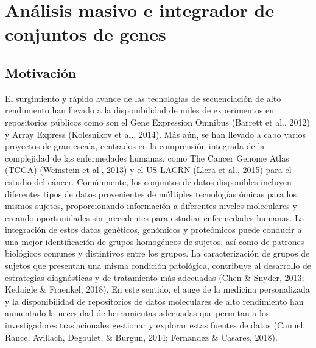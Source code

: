 \documentclass[12pt,twoside]{reedthesis}
\begin{document}
\hypertarget{cap:migsa}{%
\chapter{Análisis masivo e integrador de conjuntos de genes}\label{cap:migsa}}

\hypertarget{motivacion-1}{%
\section{Motivación}\label{motivacion-1}}

\par

El surgimiento y rápido avance de las tecnologías de secuenciación de alto rendimiento han llevado a la disponibilidad de miles de experimentos en repositorios públicos como son el Gene Expression Omnibus (Barrett et al., 2012) y Array Express (Kolesnikov et al., 2014). Más aún, se han llevado a cabo varios proyectos de gran escala, centrados en la comprensión integrada de la complejidad de las enfermedades humanas, como The Cancer Genome Atlas (TCGA) (Weinstein et al., 2013) y el US-LACRN (Llera et al., 2015) para el estudio del cáncer. Comúnmente, los conjuntos de datos disponibles incluyen diferentes tipos de datos provenientes de múltiples tecnologías ómicas para los mismos sujetos, proporcionando información a diferentes niveles moleculares y creando oportunidades sin precedentes para estudiar enfermedades humanas. La integración de estos datos genéticos, genómicos y proteómicos puede conducir a una mejor identificación de grupos homogéneos de sujetos, así como de patrones biológicos comunes y distintivos entre los grupos. La caracterización de grupos de sujetos que presentan una misma condición patológica, contribuye al desarrollo de estrategias diagnósticas y de tratamiento más adecuadas (Chen \& Snyder, 2013; Kedaigle \& Fraenkel, 2018). En este sentido, el auge de la medicina personalizada y la disponibilidad de repositorios de datos moleculares de alto rendimiento han aumentado la necesidad de herramientas adecuadas que permitan a los investigadores traslacionales gestionar y explorar estas fuentes de datos (Canuel, Rance, Avillach, Degoulet, \& Burgun, 2014; Fernandez \& Casares, 2018).

\par
\end{document}
